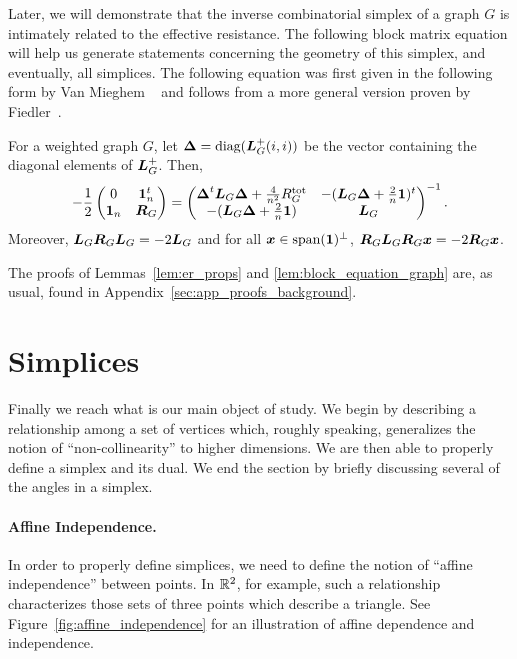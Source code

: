 Later, we will demonstrate that the inverse combinatorial  simplex of a graph $G$ is intimately  related to the  effective  resistance. The  following  block matrix  equation will help us generate statements concerning  the geometry of this simplex, and eventually, all  simplices. The following equation was first given in the following form by  Van Mieghem \etal~\cite{van2017pseudoinverse} and follows from a more general version proven by Fiedler~\cite{fiedler1993geometric, fiedler2011matrices}. 

\begin{lemma}
	\label{lem:block_equation_graph}
	For a weighted graph $G$, let $\vb*{\Delta}=\text{diag}(\vb*{L}_G^+(i,i))$ be the vector containing the diagonal  elements of $\vb*{L}_G^+$. Then, 
	\begin{equation}
	\label{eq:block_inverse_er}
	-\frac{1}{2} \begin{pmatrix}
	0 & \vb{1}_n^t \\ 
	\vb{1}_n &  \vb*{R}_G
	\end{pmatrix} = 
	\begin{pmatrix}
	\vb*{\Delta}^t \vb*{L}_G\vb*{\Delta} + \frac{4}{n^2}R^{\textnormal{tot}}_G & -(\vb*{L}_G\vb*{\Delta} + \frac{2}{n}\vb{1})^t \\
	-(\vb*{L}_G\vb*{\Delta} + \frac{2}{n}\vb{1}) & \vb*{L}_G
	\end{pmatrix}^{-1}.
	\end{equation}
	Moreover, $\vb*{L}_G\vb*{R}_G\vb*{L}_G=-2\vb*{L}_G$ and  for all $\vb*{x}\in\textnormal{span}(\vb{1})^\perp$, $\vb*{R}_G\vb*{L}_G\vb*{R}_G\vb*{x}=-2\vb*{R}_G\vb*{x}$. 
\end{lemma}

The proofs of Lemmas~\ref{lem:er_props} and \ref{lem:block_equation_graph} are, as usual, found in Appendix~\ref{sec:app_proofs_background}. 




\section{Simplices}
\label{sec:background_simplices}

Finally we reach what is our main object of study. We begin by describing a  relationship  among a set  of vertices which,  roughly speaking,  generalizes the notion of ``non-collinearity'' to  higher dimensions. We are then able to properly define a simplex and its dual. We end the section by briefly discussing several  of the angles in a simplex. 

\paragraph{Affine Independence.}
In order to properly define simplices, we need to define the  notion of ``affine independence'' between  points.  In $\mathbb{R}^2$, for example, such a relationship characterizes those sets of three points which describe a triangle. See Figure~\ref{fig:affine_independence} for an  illustration of affine dependence and independence.  


